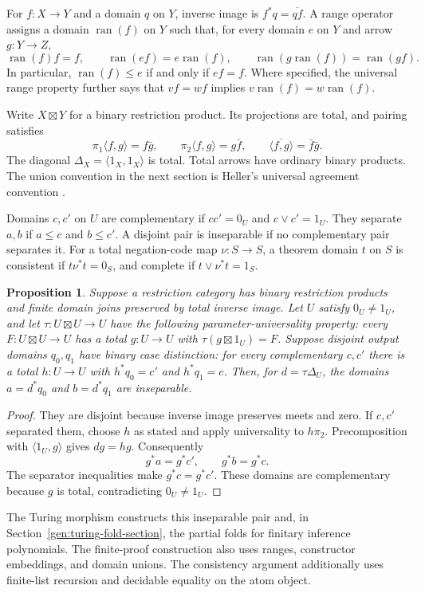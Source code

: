 \documentclass[11pt]{article}
\newtheorem{proposition}[theorem]{Proposition}
\theoremstyle{definition}
\theoremstyle{remark}
\newcommand{\ran}{\operatorname{ran}}
\begin{document}
For $f:X\to Y$ and a domain $q$ on $Y$, inverse image is
$f^*q=\overline{qf}$. A range operator assigns a domain $\ran(f)$ on
$Y$ such that, for every domain $e$ on $Y$ and arrow $g:Y\to Z$,
\[
 \ran(f)f=f,\qquad
 \ran(ef)=e\ran(f),\qquad
 \ran(g\ran(f))=\ran(gf).
\]
In particular, $\ran(f)\le e$ if and only if $ef=f$.
Where specified, the universal range property further says that
$vf=wf$ implies $v\ran(f)=w\ran(f)$.

Write $X\boxtimes Y$ for a binary restriction product. Its projections
are total, and pairing satisfies
\[
 \pi_1\langle f,g\rangle=f\bar g,\qquad
 \pi_2\langle f,g\rangle=g\bar f,\qquad
 \overline{\langle f,g\rangle}=\bar f\bar g.
\]
The diagonal $\Delta_X=\langle1_X,1_X\rangle$ is total. Total arrows
have ordinary binary products. The union convention in the next section
is Heller's universal agreement convention \cite[\S6]{Heller}.

Domains $c,c'$ on $U$ are complementary if $cc'=0_U$ and
$c\vee c'=1_U$. They separate $a,b$ if $a\le c$ and $b\le c'$.
A disjoint pair is inseparable if no complementary pair separates it.
For a total negation-code map $\nu:S\to S$, a theorem domain $t$ on
$S$ is consistent if $t\nu^*t=0_S$, and complete if
$t\vee\nu^*t=1_S$.

\begin{proposition}\label{gen:turing}
Suppose a restriction category has binary restriction products and finite
domain joins preserved by total inverse image. Let $U$ satisfy
$0_U\ne1_U$, and let $\tau:U\boxtimes U\to U$ have the following
parameter-universality property: every $F:U\boxtimes U\to U$ has a
total $g:U\to U$ with $\tau(g\boxtimes1_U)=F$. Suppose disjoint
output domains $q_0,q_1$ have binary case distinction: for every
complementary $c,c'$ there is a total $h:U\to U$ with
$h^*q_0=c'$ and $h^*q_1=c$. Then, for $d=\tau\Delta_U$, the domains
$a=d^*q_0$ and $b=d^*q_1$ are inseparable.
\end{proposition}
\begin{proof}
They are disjoint because inverse image preserves meets and zero.
If $c,c'$ separated them, choose $h$ as stated and apply universality
to $h\pi_2$. Precomposition with $\langle1_U,g\rangle$ gives
$dg=hg$. Consequently
\[
 g^*a=g^*c',\qquad g^*b=g^*c.
\]
The separator inequalities make $g^*c=g^*c'$. These domains are
complementary because $g$ is total, contradicting $0_U\ne1_U$.
\end{proof}

The Turing morphism constructs this inseparable pair and, in
Section~\ref{gen:turing-fold-section}, the partial folds for finitary
inference polynomials. The finite-proof construction also uses ranges,
constructor embeddings, and domain unions. The consistency
argument additionally uses finite-list recursion and decidable equality
on the atom object.
\end{document}
